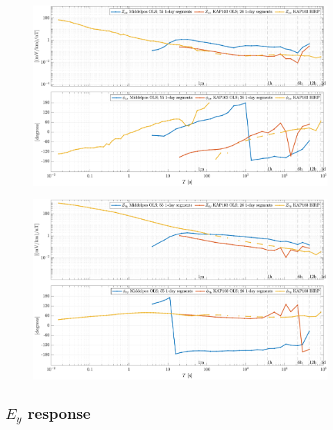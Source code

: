 \documentclass{article}
\begin{document}
\clearpage

\begin{figure}[h!]
\centering
\includegraphics[width=\textwidth]{figures/KAP103_Middelpos/transferfnZ_compare-Z_xx_Magnitude_Phase.pdf}
\caption{}
\end{figure}

\clearpage

\begin{figure}[h!]
\centering
\includegraphics[width=\textwidth]{figures/KAP103_Middelpos/transferfnZ_compare-Z_xy_Magnitude_Phase.pdf}
\caption{}
\label{fig:universe}
\end{figure}

\clearpage

\subsection{$E_y$ response}
\end{document}
